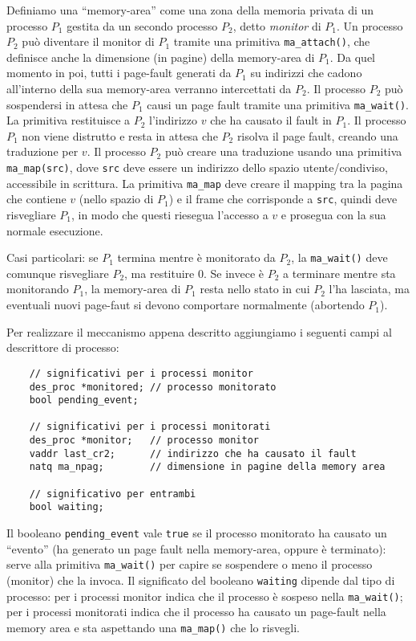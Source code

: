 Definiamo una ``memory-area'' come una zona della memoria privata di un processo $P_1$
gestita da un secondo processo $P_2$, detto {\em monitor} di $P_1$. Un processo 
$P_2$ pu\`o diventare il monitor di $P_1$ tramite una primitiva \verb|ma_attach()|, che
definisce anche la dimensione (in pagine) della memory-area di $P_1$.
Da quel momento in poi, tutti i page-fault generati da $P_1$ su indirizzi che cadono
all'interno della sua memory-area verranno intercettati da $P_2$. Il processo $P_2$
pu\`o sospendersi in attesa che $P_1$ causi un page fault tramite
una primitiva \verb|ma_wait()|. La primitiva restituisce a $P_2$ l'indirizzo $v$ che
ha causato il fault in $P_1$. Il processo $P_1$ non viene distrutto e resta in attesa
che $P_2$ risolva il page fault, creando una traduzione per $v$. Il processo $P_2$
pu\`o creare una traduzione usando una primitiva \verb|ma_map(src)|, dove \verb|src|
deve essere un indirizzo dello spazio utente/condiviso, accessibile in scrittura.
La primitiva \verb|ma_map| deve creare il mapping tra la pagina che contiene
$v$ (nello spazio di $P_1$) e il frame che corrisponde a \verb|src|,
quindi deve risvegliare $P_1$, in modo
che questi riesegua l'accesso a $v$ e prosegua con la sua normale esecuzione.

Casi particolari: se $P_1$ termina mentre \`e monitorato da $P_2$, la \verb|ma_wait()|
deve comunque risvegliare $P_2$, ma restituire 0. Se invece \`e $P_2$ a terminare mentre sta
monitorando $P_1$, la memory-area di $P_1$ resta nello stato in cui $P_2$ l'ha lasciata,
ma eventuali nuovi page-faut si devono comportare normalmente (abortendo $P_1$).

Per realizzare il meccanismo appena descritto aggiungiamo i seguenti campi al descrittore di
processo:

\begin{verbatim}
    // significativi per i processi monitor
    des_proc *monitored; // processo monitorato
    bool pending_event;	
    
    // significativi per i processi monitorati
    des_proc *monitor;   // processo monitor
    vaddr last_cr2;	     // indirizzo che ha causato il fault
    natq ma_npag;	     // dimensione in pagine della memory area
    
    // significativo per entrambi
    bool waiting;
\end{verbatim}

Il booleano \verb|pending_event| vale \verb|true| se il processo monitorato
ha causato un ``evento'' (ha generato un page fault nella memory-area, oppure \`e terminato):
serve alla primitiva \verb|ma_wait()| per capire se sospendere o meno il processo (monitor)
che la invoca. Il significato del booleano \verb|waiting| dipende dal tipo di processo:
per i processi monitor indica che il processo \`e sospeso nella \verb|ma_wait()|; per
i processi monitorati indica che il processo ha causato un page-fault nella memory
area e sta aspettando una \verb|ma_map()| che lo risvegli.

